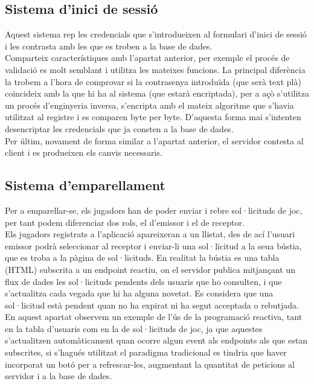 \subsection{Sistema d'inici de sessió}
Aquest sistema rep les credencials que s'introdueixen al formulari d'inici de sessió i les contrasta amb les que es troben a la base de dades.
\\[3mm]
Comparteix característiques amb l'apartat anterior, per exemple el procés de validació es molt semblant i utilitza les mateixes funcions. La principal diferència la trobem a l'hora de comprovar si la contrasenya introduïda (que serà text plà) coincideix amb la que hi ha al sistema (que estarà encriptada), per a açò s'utilitza un procés d'enginyeria inversa, s'encripta amb el mateix algoritme que s'havia utilitzat al registre i es comparen byte per byte. D'aquesta forma mai s'intenten desencriptar les credencials que ja consten a la base de dades.
\\[3mm]
Per últim, novament de forma similar a l'apartat anterior, el servidor contesta al client i es produeixen els canvis necessaris.
\subsection{Sistema d'emparellament}
Per a emparellar-se, els jugadors han de poder enviar i rebre sol·licituds de joc, per tant podem diferenciar dos rols, el d'emissor i el de receptor.
\\[3mm]
Els jugadors registrats a l'aplicació apareixeran a un llistat, des de ací l'usuari emissor podrà seleccionar al receptor i enviar-li una sol·licitud a la seua bústia, que es troba a la pàgina de sol·licituds. En realitat la bústia es una tabla (HTML) subscrita a un endpoint reactiu, on el servidor publica mitjançant un flux de dades les sol·licituds pendents dels usuaris que ho consulten, i que s'actualitza cada vegada que hi ha alguna novetat. Es considera que una sol·licitud està pendent quan no ha expirat ni ha segut acceptada o rebutjada.
\\[3mm]
En aquest apartat observem un exemple de l'ús de la programació reactiva, tant en la tabla d'usuaris com en la de sol·licituds de joc, ja que aquestes s'actualitzen automàticament quan ocorre algun event als endpoints als que estan subscrites, si s'hagués utilitzat el paradigma tradicional es tindria que haver incorporat un botó per a refrescar-les, augmentant la quantitat de peticions al servidor i a la base de dades.
